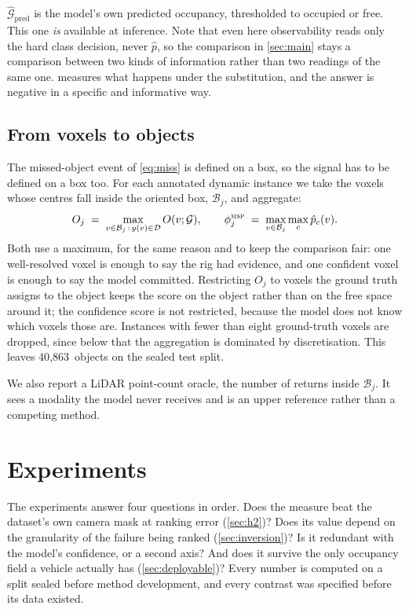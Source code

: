 \documentclass[10pt,twocolumn,letterpaper]{article}
\newcommand{\nObj}{40{,}863}
\begin{document}
$\hat{\mathcal{G}}_{\text{pred}}$ is the model's own predicted occupancy,
thresholded to occupied or free. This one \emph{is} available at inference.
Note that even here observability reads only the hard class decision, never
$\hat{p}$, so the comparison in \cref{sec:main} stays a comparison between
two kinds of information rather than two readings of the same one.
 measures what happens under the substitution, and
the answer is negative in a specific and informative way.

\subsection{From voxels to objects}
\label{sec:agg}
The missed-object event of \cref{eq:miss} is defined on a box, so the
signal has to be defined on a box too. For each annotated dynamic instance
we take the voxels whose centres fall inside the oriented box,
$\mathcal{B}_j$, and aggregate:
\begin{equation}
O_j \;=\; \max_{v \in \mathcal{B}_j \,:\, y(v)\in\mathcal{D}} O(v;\mathcal{G}),
\qquad
\phi^{\textsc{msp}}_j \;=\; \max_{v \in \mathcal{B}_j} \max_c \hat{p}_c(v).
\label{eq:agg}
\end{equation}
Both use a maximum, for the same reason and to keep the comparison fair:
one well-resolved voxel is enough to say the rig had evidence, and one
confident voxel is enough to say the model committed. Restricting $O_j$ to
voxels the ground truth assigns to the object keeps the score on the
object rather than on the free space around it; the confidence score is
not restricted, because the model does not know which voxels those are.
Instances with fewer than eight ground-truth voxels are dropped, since
below that the aggregation is dominated by discretisation. This leaves
\nObj\ objects on the sealed test split.

We also report a LiDAR point-count oracle, the number of returns inside
$\mathcal{B}_j$. It sees a modality the model never receives and is an
upper reference rather than a competing method.


\section{Experiments}

The experiments answer four questions in order. Does the measure beat the
dataset's own camera mask at ranking error (\cref{sec:h2})? Does its value
depend on the granularity of the failure being ranked
(\cref{sec:inversion})? Is it redundant with the model's confidence, or a
second axis? And does it survive the only occupancy field a vehicle
actually has (\cref{sec:deployable})? Every number is computed on a split sealed before method
development, and every contrast was specified before its data existed.
\end{document}
